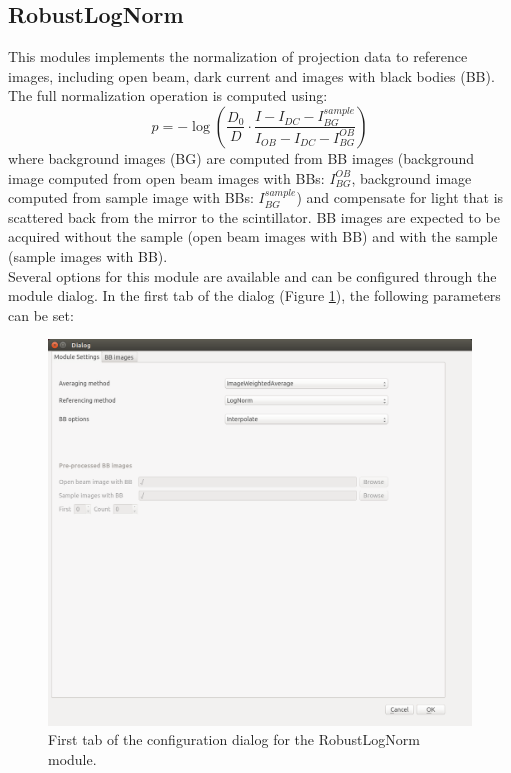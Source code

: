 \documentclass[a4paper]{scrreprt}
\begin{document}
\subsection{RobustLogNorm}
This modules implements the normalization of projection data to reference images, including open beam, dark current and images with black bodies (BB). The full normalization operation is computed using:
\begin{equation}
p=-\log\left(\frac{D_0}{D}\cdot\frac{I-I_{DC}-I_{BG}^{sample}}{I_{OB}-I_{DC}-I_{BG}^{OB}}\right) 
\end{equation}
where background images (BG) are computed from BB images (background image computed from open beam images with BBs: ${I_{BG}^{OB}}$, background image computed from sample image with BBs: $ I_{BG}^{sample} $) and compensate for light that is scattered back from the mirror to the scintillator.
BB images are expected to be acquired without the sample (open beam images with BB) and with the sample (sample images with BB). \\
Several options for this module are available and can be configured through the module dialog.
In the first tab of the dialog (Figure \ref{fig:tab1_refmodule}), the following parameters can be set:
\begin{figure}[th!]
\centering
\includegraphics[scale=0.3]{./figures3/tab1_refmodule}
\caption{First tab of the configuration dialog for the RobustLogNorm module.}
\label{fig:tab1_refmodule}
\end{figure}
\end{document}
